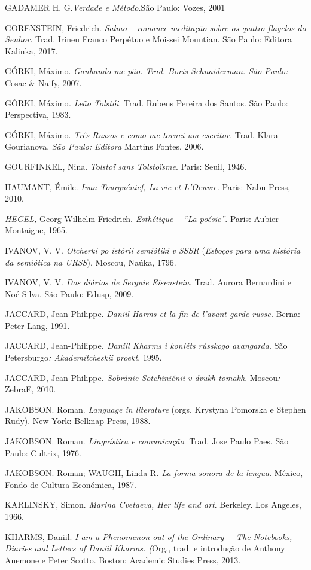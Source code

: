 {GADAMER H. G.\emph{Verdade e Método.}São Paulo: Vozes, 2001

GORENSTEIN, Friedrich. \emph{Salmo -- romance-meditação sobre os quatro
flagelos do Senhor}. Trad. Irineu Franco Perpétuo e Moissei Mountian.
São Paulo: Editora Kalinka, 2017.

GÓRKI, Máximo. \emph{Ganhando me pão. Trad. Boris Schnaiderman. São
Paulo:} Cosac \& Naify, 2007.

GÓRKI, Máximo\emph{. Leão Tolstói}. Trad. Rubens Pereira dos Santos. São
Paulo: Perspectiva, 1983.

GÓRKI, Máximo. \emph{Três Russos e como me tornei um escritor.} Trad.
Klara Gourianova. \emph{São Paulo: Editora} Martins Fontes, 2006.

GOURFINKEL, Nina. \emph{Tolstoï sans Tolstoïsme}. Paris: Seuil, 1946.

HAUMANT, Émile. \emph{Ivan Tourguénief, La vie et L'Oeuvre}. Paris: Nabu
Press, 2010.

\emph{HEGEL,} Georg Wilhelm Friedrich. \emph{Esthétique -- ``La
poésie''}. Paris: Aubier Montaigne, 1965.

IVANOV, V. V. \emph{Otcherki po istórii semiótiki v SSSR} (\emph{Esboços
para uma história da semiótica na URSS}), Moscou, Naúka, 1796.

IVANOV, V. V. \emph{Dos diários de Serguie Eisenstein.} Trad. Aurora
Bernardini e Noé Silva. São Paulo: Edusp, 2009.

JACCARD, Jean-Philippe. \emph{Daniil Harms et la fin de l'avant-garde
russe.} Berna: Peter Lang, 1991.

JACCARD, Jean-Philippe\emph{. Daniil Kharms i koniéts rússkogo
avangarda.} São Petersburgo\emph{: Akademítcheskii proekt}, 1995.

JACCARD, Jean-Philippe\emph{. Sobránie Sotchiniénii v dvukh tomakh}.
Moscou\emph{:} ZebraE, 2010.

JAKOBSON. Roman. \emph{Language in literature} (orgs. Krystyna Pomorska
e Stephen Rudy). New York: Belknap Press, 1988.

JAKOBSON. Roman. \emph{Linguística e comunicação}. Trad. Jose Paulo
Paes. São Paulo: Cultrix, 1976.

JAKOBSON. Roman; WAUGH, Linda R\emph{. La forma sonora de la lengua}.
México, Fondo de Cultura Económica, 1987.

KARLINSKY, Simon. \emph{Marina Cvetaeva, Her life and art}. Berkeley.
Los Angeles, 1966.

KHARMS, Daniil. \emph{I am a Phenomenon out of the Ordinary − The
Notebooks, Diaries and Letters of Daniil Kharms. (}Org., trad. e
introdução de Anthony Anemone e Peter Scotto. Boston: Academic Studies
Press, 2013.

}
